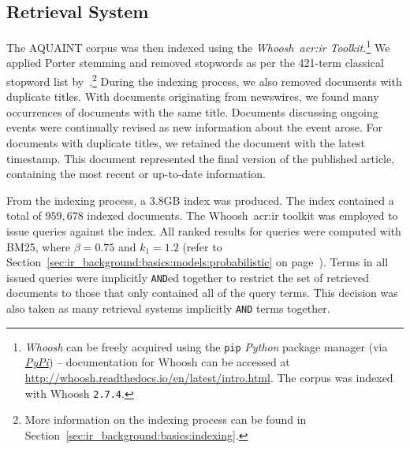 \begin{figure}[h]
    \centering
    \vspace{6mm}
    \vspace{-9mm}
    \label{fig:aquaint_stats}
\end{figure}

\subsection{Retrieval System}\label{sec:methodology:collection:system}
The AQUAINT corpus was then indexed using the \emph{Whoosh~\gls{acr:ir} Toolkit.}\footnote{\emph{Whoosh} can be freely acquired using the \texttt{pip} \emph{Python} package manager (via \href{https://pypi.org/}{\emph{PyPi}}) -- documentation for Whoosh can be accessed at \url{http://whoosh.readthedocs.io/en/latest/intro.html}.  The corpus was indexed with Whoosh \texttt{2.7.4}.} We applied Porter stemming and removed stopwords as per the 421-term classical stopword list by~\cite{fox1992stopwords}.\footnote{More information on the indexing process can be found in Section~\ref{sec:ir_background:basics:indexing}.} During the indexing process, we also removed documents with duplicate titles. With documents originating from newswires, we found many occurrences of documents with the same title. Documents discussing ongoing events were continually revised as new information about the event arose. For documents with duplicate titles, we retained the document with the latest timestamp. This document represented the final version of the published article, containing the most recent or up-to-date information.

From the indexing process, a $3.8$GB index was produced. The index contained a total of $959,678$ indexed documents. The Whoosh~\gls{acr:ir} toolkit was employed to issue queries against the index. All ranked results for queries were computed with BM25, where $\beta=0.75$ and $k_1=1.2$ (refer to Section~\ref{sec:ir_background:basics:models:probabilistic} on page~\pageref{sec:ir_background:basics:models:probabilistic}). Terms in all issued queries were implicitly \texttt{AND}ed together to restrict the set of retrieved documents to those that only contained all of the query terms. This decision was also taken as many retrieval systems implicitly \texttt{AND} terms together.

